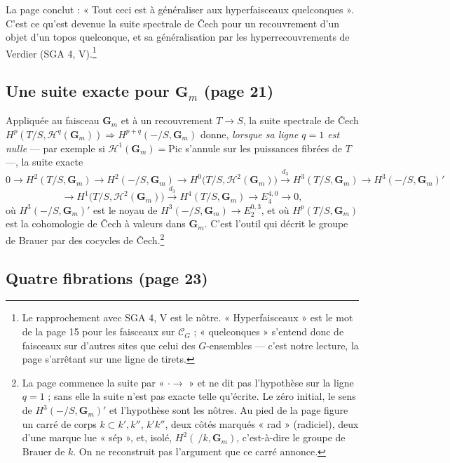 \documentclass[11pt,a4paper]{article}
\begin{document}
La page conclut : « Tout ceci est à généraliser aux hyperfaisceaux
quelconques ». C'est ce qu'est devenue la suite spectrale de Čech pour un
recouvrement d'un objet d'un topos quelconque, et sa généralisation par les
hyperrecouvrements de Verdier (SGA 4, V).\footnote{Le rapprochement avec
SGA 4, V est le nôtre. « Hyperfaisceaux » est le mot de la page 15 pour
les faisceaux sur $\mathcal{C}_G$ ; « quelconques » s'entend donc de
faisceaux sur d'autres sites que celui des $G$-ensembles --- c'est notre
lecture, la page s'arrêtant sur une ligne de tirets.}

\subsection*{Une suite exacte pour $\mathbf{G}_m$ (page 21)}

Appliquée au faisceau $\mathbf{G}_m$ et à un recouvrement $T \to S$, la
suite spectrale de Čech
$H^{p}(T/S, \mathcal{H}^{q}(\mathbf{G}_m)) \Rightarrow H^{p+q}(-/S,
\mathbf{G}_m)$ donne, \emph{lorsque sa ligne $q = 1$ est nulle} --- par
exemple si $\mathcal{H}^{1}(\mathbf{G}_m) = \mathrm{Pic}$ s'annule sur les
puissances fibrées de $T$ ---, la suite exacte
\[
  0 \to H^{2}(T/S, \mathbf{G}_m) \to H^{2}(-/S, \mathbf{G}_m) \to
  H^{0}\bigl(T/S, \mathcal{H}^{2}(\mathbf{G}_m)\bigr) \xrightarrow{\ d_3\ }
  H^{3}(T/S, \mathbf{G}_m) \to H^{3}(-/S, \mathbf{G}_m)'
\]
\[
  \to H^{1}\bigl(T/S, \mathcal{H}^{2}(\mathbf{G}_m)\bigr) \xrightarrow{\ d_3\ }
  H^{4}(T/S, \mathbf{G}_m) \to E_4^{4,0} \to 0,
\]
où $H^{3}(-/S, \mathbf{G}_m)'$ est le noyau de $H^{3}(-/S, \mathbf{G}_m) \to
E_2^{0,3}$, et où $H^{p}(T/S, \mathbf{G}_m)$ est la cohomologie de Čech à
valeurs dans $\mathbf{G}_m$. C'est l'outil qui décrit le groupe de Brauer
par des cocycles de Čech.\footnote{La page commence la suite par « $\cdot
\to$ » et ne dit pas l'hypothèse sur la ligne $q = 1$ ; sans elle la suite
n'est pas exacte telle qu'écrite. Le zéro initial, le sens de
$H^{3}(-/S, \mathbf{G}_m)'$ et l'hypothèse sont les nôtres. Au pied de la
page figure un carré de corps $k \subset k', k''$, $k'k''$, deux côtés
marqués « rad » (radiciel), deux d'une marque lue « sép », et, isolé,
$H^{2}(\ /k, \mathbf{G}_m)$, c'est-à-dire le groupe de Brauer de $k$. On ne
reconstruit pas l'argument que ce carré annonce.}

\subsection*{Quatre fibrations (page 23)}
\end{document}
